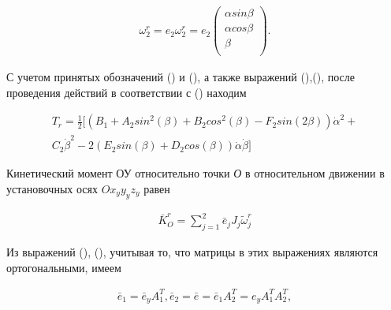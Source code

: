 \begin{equation}
\label{eq:p3:10}
\begin{alignedat}{2}
 \omega_{2}^{r}=e_{2} \omega_{2}^{r}=e_{2} \left( \begin{matrix}
\alpha sin \beta \\
\alpha cos \beta \\
\beta \\
\end{matrix}
\right) .
\end{alignedat}
\end{equation}

С учетом принятых обозначений () и (), а также выражений (),(), после проведения действий в соответствии с () находим\par

\begin{equation}
\label{eq:p3:11}
\begin{alignedat}{2}
T_{r}=
\frac{1}{2} 
[  
	( 
		B_{1}+
		A_{2}sin^{2} (  \beta  ) +
		B_{2}cos^{2} (  \beta  ) -
		F_{2}sin ( 2 \beta  )  
	)  \dot{\alpha}^{2} + \\
	C_{2} \dot{\beta}^{2} -  
	2 ( 
		E_{2}sin (  \beta  ) +
		D_{2}cos (  \beta  )  
	)  
	\dot{\alpha}  \dot{\beta}  
] 
\end{alignedat}
\end{equation}

Кинетический момент ОУ относительно точки \textit{О} в относительном движении в установочных осях  \( Ox_{y}y_{y}z_{y} \)  равен\par

\begin{equation}
\label{eq:p3:12}
\begin{alignedat}{2}
\bar{K}_{O}^{r}= \sum_{j=1}^{2}\bar{e}_{j}J_{j} \tilde{\omega}_{j}^{r}
\end{alignedat}
\end{equation}

Из выражений (), (), учитывая то, что матрицы в этих выражениях являются ортогональными, имеем\par

\begin{equation}
\label{eq:p3:13}
\begin{alignedat}{2}
\bar{e}_{1} = \bar{e}_{y} A_{1}^{T} ,
\bar{e}_{2} = 
\bar{e} = 
\bar{e}_{1}A_{2}^{T} = 
e_{y}A_{1}^{T}A_{2}^{T} ,
\end{alignedat}
\end{equation}

